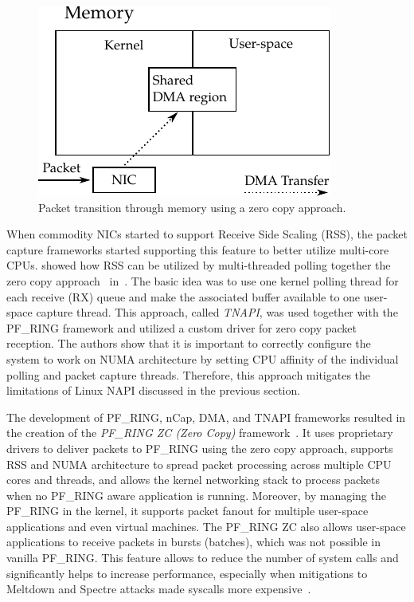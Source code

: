 \begin{figure}[!tb]
  \begin{center}
    \includegraphics{figures/c05/zero_copy}
  \end{center}
  \caption{Packet transition through memory using a zero copy approach.}
  \label{fig:zero_copy}
\end{figure}

When commodity NICs started to support Receive Side Scaling (RSS), the packet capture frameworks started supporting this feature to better utilize multi-core CPUs. \citeauthor{Fusco-2010-High} showed how RSS can be utilized by multi-threaded polling together the zero copy approach~\cite{Fusco-2010-High} in~\citeyear{Fusco-2010-High}. The basic idea was to use one kernel polling thread for each receive (RX) queue and make the associated buffer available to one user-space capture thread. This approach, called \emph{TNAPI}, was used together with the PF\_RING framework and utilized a custom driver for zero copy packet reception. The authors show that it is important to correctly configure the system to work on NUMA architecture by setting CPU affinity of the individual polling and packet capture threads. Therefore, this approach mitigates the limitations of Linux NAPI discussed in the previous section. 

The development of PF\_RING, nCap, DMA, and TNAPI frameworks resulted in the creation of the \emph{PF\_RING ZC (Zero Copy)} framework~\cite{ntop--PFRING}. It uses proprietary drivers to deliver packets to PF\_RING using the zero copy approach, supports RSS and NUMA architecture to spread packet processing across multiple CPU cores and threads, and allows the kernel networking stack to process packets when no PF\_RING aware application is running. Moreover, by managing the PF\_RING in the kernel, it supports packet fanout for multiple user-space applications and even virtual machines. The PF\_RING ZC also allows user-space applications to receive packets in bursts (batches), which was not possible in vanilla PF\_RING. This feature allows to reduce the number of system calls and significantly helps to increase performance, especially when mitigations to Meltdown and Spectre attacks made syscalls more expensive~\cite{Gregg-2018-KPTIKAISER}.


